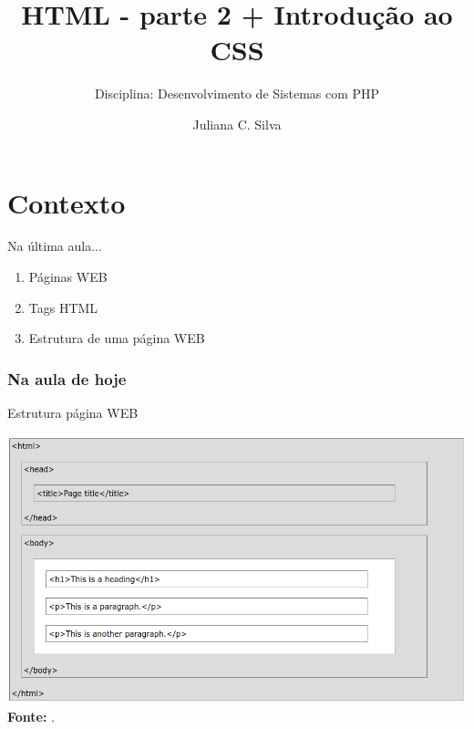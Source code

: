 \documentclass{beamer}
\title[HTML + CSS]{HTML - parte 2 + Introdução ao CSS}
\subtitle{Disciplina: Desenvolvimento de Sistemas com PHP}
\author{Juliana C. Silva}
\institute{Universidade Positivo}
\begin{document}
\frame{\titlepage}
 

\section{Contexto}
\begin{frame}{Na última aula...}
  \begin{enumerate}
   \item Páginas WEB
   \item Tags HTML
   \item Estrutura de uma página WEB
  \end{enumerate}
\end{frame}
\begin{frame}
\frametitle{Na aula de hoje} 
\tableofcontents 
\end{frame}
\begin{frame}{Estrutura página WEB}
		\begin{center}
\includegraphics[height=0.65\paperheight]{fig/aula2/html_page.png} \\
    		\tiny \textbf{Fonte:} \cite{wschool2021html}.
		\end{center}
\end{frame}
\end{document}

